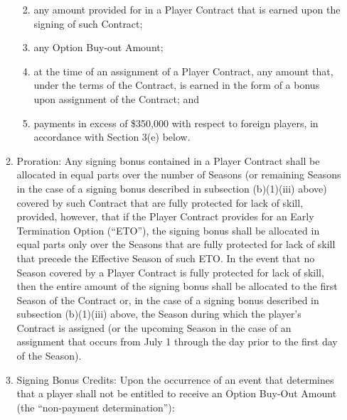 \documentclass[
]{book}
\providecommand{\tightlist}{%
  \setlength{\itemsep}{0pt}\setlength{\parskip}{0pt}}
\begin{document}
\begin{enumerate}
\begin{enumerate}
    \begin{enumerate}
    \def\labelenumiii{(\roman{enumiii})}
    \tightlist
    \item
      any amount provided for in a Player Contract that is earned upon the signing of such Contract;
    \item
      any Option Buy-out Amount;
    \item
      at the time of an assignment of a Player Contract, any amount that, under the terms of the Contract, is earned in the form of a bonus upon assignment of the Contract; and
    \item
      payments in excess of \$350,000 with respect to foreign players, in accordance with Section 3(e) below.
    \end{enumerate}
  \item
    Proration: Any signing bonus contained in a Player Contract shall be allocated in equal parts over the number of Seasons (or remaining Seasons in the case of a signing bonus described in subsection (b)(1)(iii) above) covered by such Contract that are fully protected for lack of skill, provided, however, that if the Player Contract provides for an Early Termination Option (``ETO''), the signing bonus shall be allocated in equal parts only over the Seasons that are fully protected for lack of skill that precede the Effective Season of such ETO. In the event that no Season covered by a Player Contract is fully protected for lack of skill, then the entire amount of the signing bonus shall be allocated to the first Season of the Contract or, in the case of a signing bonus described in subsection (b)(1)(iii) above, the Season during which the player's Contract is assigned (or the upcoming Season in the case of an assignment that occurs from July 1 through the day prior to the first day of the Season).
  \item
    Signing Bonus Credits: Upon the occurrence of an event that determines that a player shall not be entitled to receive an Option Buy-Out Amount (the ``non-payment determination''):


\end{enumerate}
\end{enumerate}
\end{document}
